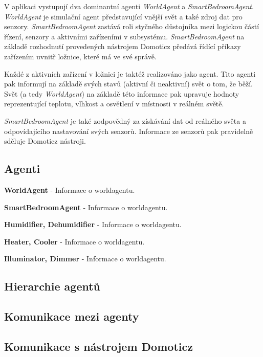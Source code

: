 \documentclass[a4paper,12pt]{article}
\begin{document}
    V aplikaci vystupují dva dominantní agenti \textit{WorldAgent} a \textit{SmartBedroomAgent}. \textit{WorldAgent} je simulační agent představující vnější svět a také zdroj dat pro senzory. \textit{SmartBedroomAgent} zastává roli styčného důstojníka mezi logickou částí řízení, senzory a aktivními zařízeními v subsystému. \textit{SmartBedroomAgent} na základě rozhodnutí provedených nástrojem Domoticz předává řídící příkazy zařízením uvnitř ložnice, které má ve své správě. 

    Každé z aktivních zařízení v ložnici je taktéž realizováno jako agent. Tito agenti pak informují na základě svých stavů (aktivní či neaktivní) svět o tom, že běží. Svět (a tedy \textit{WorldAgent}) na základě této informace pak upravuje hodnoty reprezentující teplotu, vlhkost a osvětlení v místnosti v reálném světě.

    \textit{SmartBedroomAgent} je také zodpovědný za získávání dat od reálného světa a odpovídajícího nastavování svých senzorů. Informace ze senzorů pak pravidelně sděluje Domoticz nástroji.

    \subsection{Agenti}
    \textbf{WorldAgent} - Informace o worldagentu.
    
    \textbf{SmartBedroomAgent} - Informace o worldagentu.
    
    \textbf{Humidifier, Dehumidifier} - Informace o worldagentu.
    
    \textbf{Heater, Cooler} - Informace o worldagentu.
    
    \textbf{Illuminator, Dimmer} - Informace o worldagentu.

    \subsection{Hierarchie agentů}
    \subsection{Komunikace mezi agenty}
    \subsection{Komunikace s nástrojem Domoticz}

	
\end{document}
